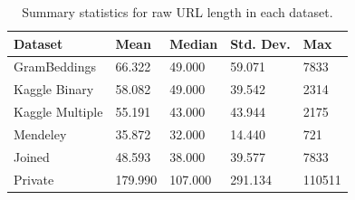 \begin{table}[H]
    \centering
    \renewcommand{\arraystretch}{1.2}
    \begin{tabular}{lllll}
        \toprule
        \textbf{Dataset} & \textbf{Mean} & \textbf{Median} & \textbf{Std. Dev.} & \textbf{Max} \\
        \midrule
        GramBeddings     & 66.322        & 49.000          & 59.071             & 7833         \\
        Kaggle Binary    & 58.082        & 49.000          & 39.542             & 2314         \\
        Kaggle Multiple  & 55.191        & 43.000          & 43.944             & 2175         \\
        Mendeley         & 35.872        & 32.000          & 14.440             & 721          \\
        Joined           & 48.593        & 38.000          & 39.577             & 7833         \\
        Private          & 179.990       & 107.000         & 291.134            & 110511       \\
        \bottomrule
    \end{tabular}
    \caption{Summary statistics for raw URL length in each dataset.}
    \label{tab:url_length_summary}
\end{table}